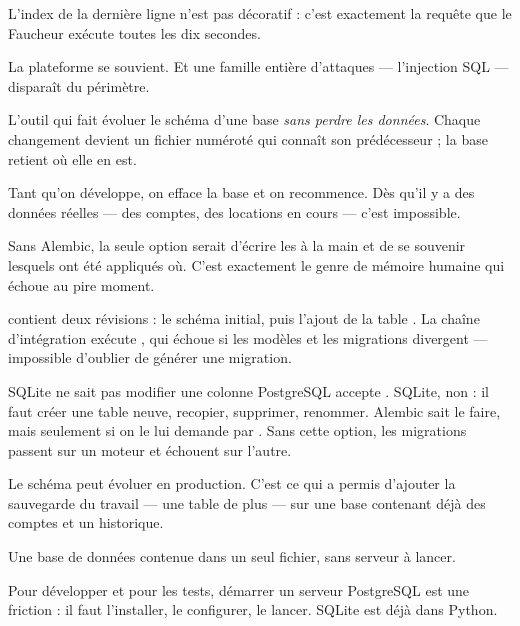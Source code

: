 L'index de la dernière ligne n'est pas décoratif : c'est exactement la requête
que le Faucheur exécute toutes les dix secondes.

\apport
La plateforme se souvient. Et une famille entière d'attaques --- l'injection
SQL --- disparaît du périmètre.


\quoi
L'outil qui fait évoluer le schéma d'une base \emph{sans perdre les données}.
Chaque changement devient un fichier numéroté qui connaît son prédécesseur ; la
base retient où elle en est.

\pourquoi
Tant qu'on développe, on efface la base et on recommence. Dès qu'il y a des
données réelles --- des comptes, des locations en cours --- c'est impossible.

Sans Alembic, la seule option serait d'écrire les  à la main et
de se souvenir lesquels ont été appliqués où. C'est exactement le genre de
mémoire humaine qui échoue au pire moment.

\role
{} contient deux révisions : le schéma initial, puis
l'ajout de la table . La chaîne d'intégration exécute
, qui échoue si les modèles et les migrations divergent ---
impossible d'oublier de générer une migration.

\begin{piege}{SQLite ne sait pas modifier une colonne}
PostgreSQL accepte . SQLite, non : il faut
créer une table neuve, recopier, supprimer, renommer. Alembic sait le faire,
mais seulement si on le lui demande par . Sans cette
option, les migrations passent sur un moteur et échouent sur l'autre.
\end{piege}

\apport
Le schéma peut évoluer en production. C'est ce qui a permis d'ajouter la
sauvegarde du travail --- une table de plus --- sur une base contenant déjà des
comptes et un historique.


\quoi
Une base de données contenue dans un seul fichier, sans serveur à lancer.

\pourquoi
Pour développer et pour les tests, démarrer un serveur PostgreSQL est une
friction : il faut l'installer, le configurer, le lancer. SQLite est déjà dans
Python.

